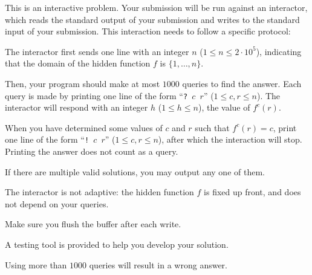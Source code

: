 
This is an interactive problem. Your submission will be run against an interactor, which reads
the standard output of your submission and writes to the standard input of your submission. This
interaction needs to follow a specific protocol:

The interactor first sends
one line with an integer $n$ ($1 \leq n \leq 2\cdot 10^5$),
indicating that the domain of the hidden function $f$ is $\{1,\dots,n\}$.

Then, your program should make at most $1000$ queries to find the answer.
Each query is made by printing one line of the form ``\texttt{?~$c$~$r$}'' ($1 \leq c, r \leq n$).
The interactor will respond with an integer $h$ ($1 \leq h \leq n$), the value of $f^c(r)$.

When you have determined some values of $c$ and $r$ such that $f^c(r) = c$,
print one line of the form ``\texttt{!~$c$~$r$}'' ($1 \leq c, r \leq n$),
after which the interaction will stop.
Printing the answer does not count as a query.

If there are multiple valid solutions, you may output any one of them.

The interactor is not adaptive: the hidden function $f$ is fixed up front, and does not depend on your queries.

Make sure you flush the buffer after each write.

A testing tool is provided to help you develop your solution.

Using more than $1000$ queries will result in a wrong answer.
